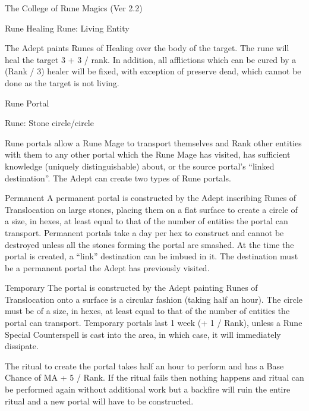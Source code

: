 \begin{Chapter}{The College of Rune Magics (Ver 2.2)}
\begin{ritual}[R-5]{Rune Healing }
Rune: Living Entity 
\begin{effects}
The Adept paints Runes of Healing over the body of the target. The
rune will heal the target 3 + 3 / rank.  In addition, all afflictions
which can be cured by a (Rank / 3) healer will be fixed, with
exception of preserve dead, which cannot be done as the target is not
living.
\end{effects}
\end{ritual}

\begin{ritual}[R-6]{Rune Portal }

Rune: Stone circle/circle 
\begin{effects}
Rune portals allow a Rune Mage to transport themselves and Rank other
entities with them to any other portal which the Rune Mage has
visited, has sufficient knowledge (uniquely distinguishable) about,
or the source portal’s “linked destination”.  The Adept can create two
types of Rune portals.

Permanent  A  permanent  portal  is  constructed  by 
the  Adept  inscribing  Runes  of  Translocation  on 
large stones, placing them on a flat surface to create a circle of a size, in hexes, at least equal to that 
of  the  number  of  entities  the  portal  can  transport. 
Permanent  portals  take  a  day  per  hex  to  construct 
and cannot be destroyed unless all the stones forming the portal are smashed. At the time the portal is 
created,  a  “link”  destination  can  be  imbued  in  it. 
The  destination  must  be  a  permanent  portal  the 
Adept has previously visited. 

Temporary  The  portal  is  constructed by  the  Adept 
painting Runes of Translocation onto a surface is a 
circular  fashion  (taking  half  an  hour).  The  circle 
must be of a size, in hexes, at least equal to that of 
the  number  of  entities  the  portal  can  transport. 
Temporary portals last 1 week (+ 1 / Rank), unless 
a Rune Special Counterspell is cast into the area, in 
which case, it will immediately dissipate. 

The ritual to create the portal takes half an hour to 
perform and has a Base Chance of MA + 5 / Rank. 
If  the  ritual  fails  then  nothing  happens  and  ritual 
can  be  performed  again  without  additional  work 
but a backfire will ruin the entire ritual and a new 
portal will have to be constructed. 


\end{effects}
\end{ritual}
\end{Chapter}
